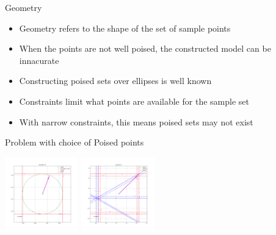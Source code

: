 \documentclass{beamer}
\begin{document}
\begin{frame}{Geometry}
    \begin{itemize}
        \item<1, 2, 3> Geometry refers to the shape of the set of sample points
        \item<1, 2, 3> When the points are not well poised, the constructed model can be innacurate \\
        \item<3> Constructing poised sets over ellipses is well known
        \item<3> Constraints limit what points are available for the sample set
        \item<3> With narrow constraints, this means poised sets may not exist
    \end{itemize}
\end{frame}


\begin{frame}{Problem with choice of Poised points}
\begin{center}
\includegraphics[width=120px]{images/nearly_poised.png} \includegraphics[width=120px]{images/nearly_poised_for_subset.png}  
\end{center}
\end{frame}
\end{document}
